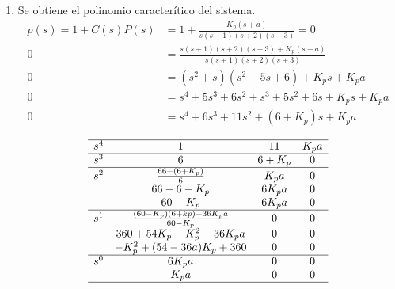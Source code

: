 \renewcommand{\theenumi}{\large\bfseries\alph{enumi}}

\begin{ejercicio}
  \begin{enumerate}
    \item 
    Se obtiene el polinomio caracterítico del sistema.
    \begin{align*}
      p(s) = 1+C(s)P(s) &= 1+\frac{K_p(s+a)}{s(s+1)(s+2)(s+3)} = 0
      \\
      0 &= \frac{s(s+1)(s+2)(s+3)+K_p(s+a)}{s(s+1)(s+2)(s+3)}
      \\
      0 &= (s^2+s)(s^2+5s+6)+K_ps+K_pa
      \\
      0 &= s^4+5s^3+6s^2+s^3+5s^2+6s+K_ps+K_pa
      \\
      0 &= s^4+6s^3+11s^2+(6+K_p)s+K_pa
    \end{align*}

\renewcommand{\arraystretch}{1.5}
  \[
    \begin{matrix}
    \hline
    s^4 & 1 & 11 & K_p a
    \\\hline
    s^3 & 6 & 6+K_p & 0
    \\\hline
    s^2 & \frac{66-(6+K_p)}{6} & K_p a & 0
    \\
     & 66-6-K_p & 6K_p a & 0
    \\
     & 60-K_p & 6K_p a & 0
    \\\hline
    s^1 & \frac{(60-K_p)(6+kp)-36K_p a}{60-K_p} & 0 & 0 
    \\
     & 360+54K_p-K_p^2 - 36K_p a & 0 & 0
    \\
     & -K_p^2 + (54-36a)K_p + 360 & 0 & 0
    \\\hline
    s^0 & 6K_p a & 0 & 0
    \\
     & K_p a & 0 & 0
    \\\hline
    \end{matrix}
  \]


\end{enumerate}
\end{ejercicio}
